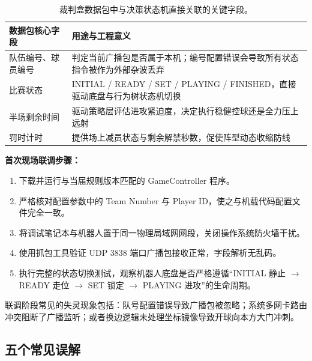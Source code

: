 \begin{table}[H]
\centering
\small
\begin{tabularx}{\textwidth}{p{3.2cm} X}
\toprule
\textbf{数据包核心字段} & \textbf{用途与工程意义} \\
\midrule
队伍编号、球员编号 & 判定当前广播包是否属于本机；编号配置错误会导致所有状态指令被作为外部杂波丢弃 \\
\addlinespace
比赛状态 & INITIAL / READY / SET / PLAYING / FINISHED，直接驱动底盘与行为树状态机切换 \\
\addlinespace
半场剩余时间 & 驱动策略层评估进攻紧迫度，决定执行稳健控球还是全力压上远射 \\
\addlinespace
罚时计时 & 提供场上减员状态与剩余解禁秒数，促使阵型动态收缩防线 \\
\bottomrule
\end{tabularx}
\caption{裁判盒数据包中与决策状态机直接关联的关键字段。}
\end{table}

\noindent\textbf{首次现场联调步骤：}

\begin{enumerate}[leftmargin=*]
    \item 下载并运行与当届规则版本匹配的 GameController 程序。
    \item 严格核对配置参数中的 Team Number 与 Player ID，使之与机载代码配置文件完全一致。
    \item 将调试笔记本与机器人置于同一物理局域网网段，关闭操作系统防火墙干扰。
    \item 使用抓包工具验证 UDP 3838 端口广播包接收正常，字段解析无乱码。
    \item 执行完整的状态切换测试，观察机器人底盘是否严格遵循“INITIAL 静止 $\rightarrow$ READY 走位 $\rightarrow$ SET 锁定 $\rightarrow$ PLAYING 进攻”的生命周期。
\end{enumerate}

\noindent 联调阶段常见的失灵现象包括：队号配置错误导致广播包被忽略；系统多网卡路由冲突阻断了广播监听；或者换边逻辑未处理坐标镜像导致开球向本方大门冲刺。

\subsection{五个常见误解}


